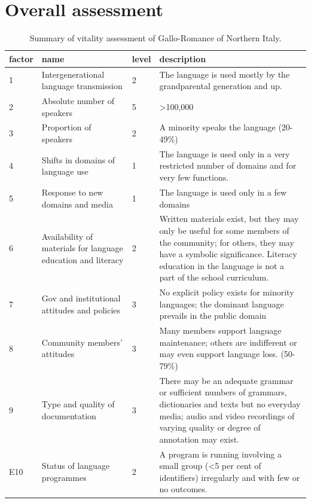 \documentclass[a4paper,11pt]{article}
\begin{document}
\section{Overall assessment}

\begin{table}
\caption{Summary of vitality assessment of Gallo-Romance of Northern Italy.}
\label{tab:overall}
\centering
\begin{tabular}{@{}l>{\raggedright\arraybackslash\hspace{0pt}}p{4cm}lp{10cm}@{}}
\toprule
factor & name & level & description \\ \midrule
1 & Intergenerational language transmission & 2 & The language is used mostly by the grandparental generation and up. \\\midrule
2 & Absolute number of speakers & 5 & \textgreater 100,000 \\\midrule
3 & Proportion of speakers & 2 & A minority speaks the language (20-49\%) \\\midrule
4 & Shifts in domains of language use & 1 & The language is used only in a very restricted number of domains and for very few functions. \\\midrule
5 & Response to new domains and media & 1 & The language is used only in a few domains \\\midrule
6 & Availability of materials for language education and literacy & 2 & Written materials exist, but they may only be useful for some members of the community; for others, they may have a symbolic significance. Literacy education in the language is not a part of the school curriculum. \\\midrule
7 & Gov and institutional attitudes and policies & 3 & No explicit policy exists for minority languages; the dominant language prevails in the public domain \\\midrule
8 & Community members' attitudes & 3 & Many members support language maintenance; others are indifferent or may even support language loss. (50-79\%) \\\midrule
9 & Type and quality of documentation & 3 & There may be an adequate grammar or sufficient numbers of grammars, dictionaries and texts but no everyday media; audio and video recordings of varying quality or degree of annotation may exist. \\\midrule
E10 & Status of language programmes & 2 & A program is running involving a small group (\textless{}5 per cent of identifiers) irregularly and with few or no outcomes. \\\midrule

\end{tabular}
\end{table}
\end{document}
